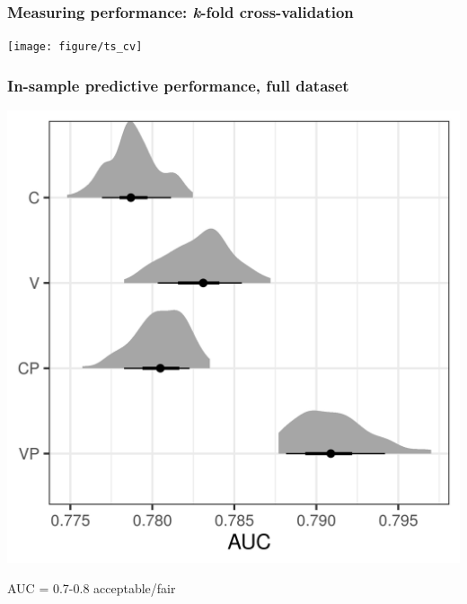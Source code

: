 \documentclass[aspectratio=169]{beamer}
\begin{document}
\begin{frame}
  \frametitle{Measuring performance: \textit{k}-fold cross-validation}

  \begin{center}
    \texttt{[image: figure/ts\_cv]}
  \end{center}


\end{frame}

%
%
%

\begin{frame}
  \frametitle{In-sample predictive performance, full dataset}

  \begin{center}
    \includegraphics[width=\textwidth,height=0.8\textheight,keepaspectratio=true]{../results/figure/auc_hist_full}

    \footnotesize{AUC = 0.7-0.8 acceptable/fair}
  \end{center}

\end{frame}
\end{document}
